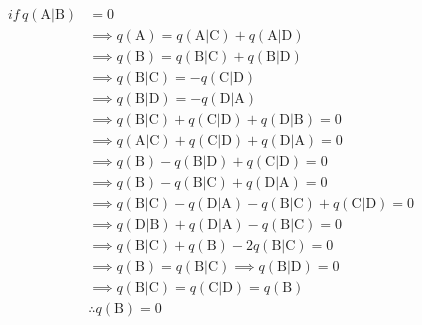 \begin{align}
    if\, q(\mathrm{A}|\mathrm{B}) &= 0 \nonumber \\
      & \implies q(\mathrm{A}) = q(\mathrm{A}|\mathrm{C}) + q(\mathrm{A}|\mathrm{D}) \nonumber \\
      & \implies q(\mathrm{B}) = q(\mathrm{B}|\mathrm{C}) + q(\mathrm{B}|\mathrm{D}) \nonumber \\
      & \implies q(\mathrm{B}|\mathrm{C}) = -q(\mathrm{C}|\mathrm{D}) \nonumber \\
      & \implies q(\mathrm{B}|\mathrm{D}) = -q(\mathrm{D}|\mathrm{A}) \nonumber \\
      & \implies q(\mathrm{B}|\mathrm{C}) + q(\mathrm{C}|\mathrm{D}) + q(\mathrm{D}|\mathrm{B}) = 0 \nonumber \\
      & \implies q(\mathrm{A}|\mathrm{C}) + q(\mathrm{C}|\mathrm{D}) + q(\mathrm{D}|\mathrm{A}) = 0 \nonumber \\
      & \implies q(\mathrm{B}) - q(\mathrm{B}|\mathrm{D}) + q(\mathrm{C}|\mathrm{D}) = 0 \nonumber \\
      & \implies q(\mathrm{B}) - q(\mathrm{B}|\mathrm{C}) + q(\mathrm{D}|\mathrm{A}) = 0 \nonumber \\
      & \implies q(\mathrm{B}|\mathrm{C}) - q(\mathrm{D}|\mathrm{A}) - q(\mathrm{B}|\mathrm{C}) + q(\mathrm{C}|\mathrm{D}) = 0 \nonumber \\
      & \implies q(\mathrm{D}|\mathrm{B}) + q(\mathrm{D}|\mathrm{A}) -q(\mathrm{B}|\mathrm{C})= 0 \nonumber \\
      & \implies q(\mathrm{B}|\mathrm{C}) + q(\mathrm{B}) - 2q(\mathrm{B}|\mathrm{C}) = 0 \nonumber \\
      & \implies q(\mathrm{B}) = q(\mathrm{B}|\mathrm{C}) \implies q(\mathrm{B}|\mathrm{D}) = 0 \nonumber \\
      & \implies q(\mathrm{B}|\mathrm{C}) = q(\mathrm{C}|\mathrm{D}) = q(\mathrm{B}) \nonumber \\
      & \therefore q(\mathrm{B}) = 0
\end{align}

